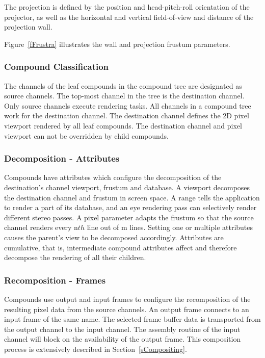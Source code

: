 \documentclass[10pt,a4]{scrartcl}
\newcommand{\fig}[1]{Figure~\ref{#1}}
\newcommand{\sref}[1]{Section~\ref{#1}}
\begin{document}
The projection is defined by the position and head-pitch-roll
orientation of the projector, as well as the horizontal and vertical
field-of-view and distance of the projection wall. 

\fig{fFrustra} illustrates the wall and projection frustum parameters.

\subsubsection{Compound Classification}
The channels of the leaf compounds in the compound tree are designated
as source channels. The top-most channel in the tree is the destination
channel. Only source channels execute rendering tasks. All channels in a
compound tree work for the destination channel. The destination channel
defines the 2D pixel viewport rendered by all leaf compounds. The
destination channel and pixel viewport can not be overridden by child
compounds.

\subsubsection{Decomposition - Attributes}
Compounds have attributes which configure the decomposition of the
destination's channel viewport, frustum and database. A
\textsf{viewport} decomposes the destination channel and frustum in
screen space. A \textsf{range} tells the application to render a part of
its database, and an \textsf{eye} rendering pass can selectively render
different stereo passes. A \textsf{pixel} parameter adapts the frustum
so that the source channel renders every n$th$ line out of m
lines. Setting one or multiple attributes causes the parent's view to be
decomposed accordingly. Attributes are cumulative, that is, intermediate
compound attributes affect and therefore decompose the rendering of all
their children.

\subsubsection{Recomposition - Frames}
Compounds use output and input frames to configure the recomposition of
the resulting pixel data from the source channels. An output frame
connects to an input frame of the same name. The selected frame buffer
data is transported from the output channel to the input channel. The
assembly routine of the input channel will block on the availability of
the output frame. This composition process is extensively described in
\sref{sCompositing}.
\end{document}

